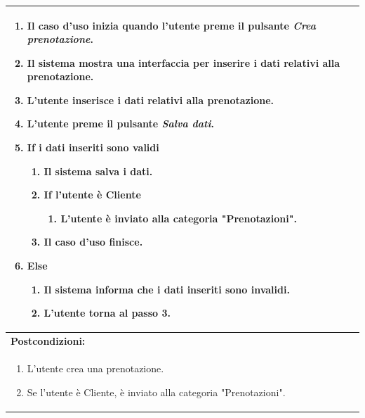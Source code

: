 \documentclass{article}
\begin{document}
\begin{table}[H]
\begin{tabular}{|p{\linewidth}|}
\begin{enumerate}
                            \item Il caso d'uso inizia quando l'utente preme il pulsante \emph{Crea prenotazione}.
                            \item Il sistema mostra una interfaccia per inserire i dati relativi alla prenotazione.
                            \item L'utente inserisce i dati relativi alla prenotazione.
                            \item L'utente preme il pulsante \emph{Salva dati}.
                            \item \textbf{If} i dati inseriti sono validi
                            \begin{enumerate}
                                \item Il sistema salva i dati.
                                \item \textbf{If} l'utente è Cliente
                                \begin{enumerate}
                                    \item L'utente è inviato alla categoria "Prenotazioni".
                                \end{enumerate}
                                \item Il caso d'uso finisce.
                            \end{enumerate}
                            \item \textbf{Else}
                            \begin{enumerate}
                                \item Il sistema informa che i dati inseriti sono invalidi.
                                \item L'utente torna al passo 3.
                            \end{enumerate}
                        \end{enumerate} \\
                        \hline
                        \cellcolor{gray!20}
                        \textbf{Postcondizioni:} \\
                        \cellcolor{gray!20}
                        \begin{minipage}{\linewidth}
                            \begin{enumerate}
                                \item L'utente crea una prenotazione.
                                \item Se l'utente è Cliente, è inviato alla categoria "Prenotazioni".

\end{enumerate}
\end{minipage}
\end{tabular}
\end{table}
\end{document}

